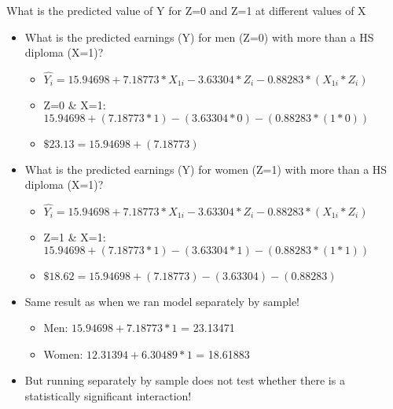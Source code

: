 \documentclass[8pt,ignorenonframetext,dvipsnames]{beamer}
\providecommand{\tightlist}{%
  \setlength{\itemsep}{0pt}\setlength{\parskip}{0pt}}
\let\olditem\item
\renewcommand{\item}{%
  \olditem\vspace{4pt}
}
\begin{document}
\begin{frame}{What is the predicted value of Y for Z=0 and Z=1 at
different values of X}
\protect\hypertarget{what-is-the-predicted-value-of-y-for-z0-and-z1-at-different-values-of-x}{}

\begin{itemize}
\tightlist
\item
  What is the predicted earnings (Y) for men (Z=0) with more than a HS
  diploma (X=1)?

  \begin{itemize}
  \tightlist
  \item
    \(\hat{Y_i} = 15.94698 + 7.18773*X_{1i} - 3.63304*Z_{i} - 0.88283*(X_{1i}*Z_{i})\)
  \item
    Z=0 \& X=1:
    \(15.94698 + (7.18773*1) - (3.63304*0) - (0.88283*(1*0))\)
  \item
    \(\$23.13 = 15.94698 + (7.18773)\)
  \end{itemize}
\item
  What is the predicted earnings (Y) for women (Z=1) with more than a HS
  diploma (X=1)?

  \begin{itemize}
  \tightlist
  \item
    \(\hat{Y_i} = 15.94698 + 7.18773*X_{1i} - 3.63304*Z_{i} - 0.88283*(X_{1i}*Z_{i})\)
  \item
    Z=1 \& X=1:
    \(15.94698 + (7.18773*1) - (3.63304*1) - (0.88283*(1*1))\)
  \item
    \(\$18.62 = 15.94698 + (7.18773) - (3.63304) - (0.88283)\)
  \end{itemize}
\end{itemize}

\medskip

\begin{itemize}
\tightlist
\item
  Same result as when we ran model separately by sample!

  \begin{itemize}
  \tightlist
  \item
    Men: \(15.94698 + 7.18773*1\) = 23.13471
  \item
    Women: \(12.31394 + 6.30489*1\) = 18.61883
  \end{itemize}
\item
  But running separately by sample does not test whether there is a
  statistically significant interaction!
\end{itemize}

\end{frame}
\end{document}
